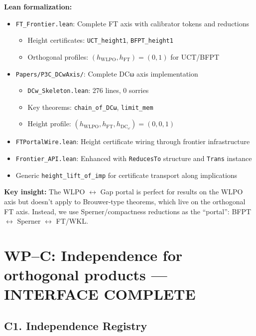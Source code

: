 \documentclass[11pt]{article}
\theoremstyle{definition}
\theoremstyle{remark}
\begin{document}
\textbf{Lean formalization:}
\begin{itemize}
\item \texttt{FT\_Frontier.lean}: Complete FT axis with calibrator tokens and reductions
  \begin{itemize}
  \item Height certificates: \texttt{UCT\_height1}, \texttt{BFPT\_height1}
  \item Orthogonal profiles: $(h_{\text{WLPO}}, h_{\text{FT}}) = (0, 1)$ for UCT/BFPT
  \end{itemize}
\item \texttt{Papers/P3C\_DCwAxis/}: Complete DCω axis implementation
  \begin{itemize}
  \item \texttt{DCw\_Skeleton.lean}: 276 lines, 0 sorries
  \item Key theorems: \texttt{chain\_of\_DCω}, \texttt{limit\_mem}
  \item Height profile: $(h_{\text{WLPO}}, h_{\text{FT}}, h_{\text{DC}_\omega}) = (0, 0, 1)$
  \end{itemize}
\item \texttt{FTPortalWire.lean}: Height certificate wiring through frontier infrastructure
\item \texttt{Frontier\_API.lean}: Enhanced with \texttt{ReducesTo} structure and \texttt{Trans} instance
\item Generic \texttt{height\_lift\_of\_imp} for certificate transport along implications
\end{itemize}

\textbf{Key insight:} The WLPO $\leftrightarrow$ Gap portal is perfect for results on the WLPO axis but doesn't apply to Brouwer-type theorems, which live on the orthogonal FT axis. Instead, we use Sperner/compactness reductions as the ``portal'': BFPT $\leftrightarrow$ Sperner $\leftrightarrow$ FT/WKL.

\section{WP–C: Independence for orthogonal products — \textbf{\color{green}INTERFACE COMPLETE}}

\subsection{C1. Independence Registry}
\end{document}
